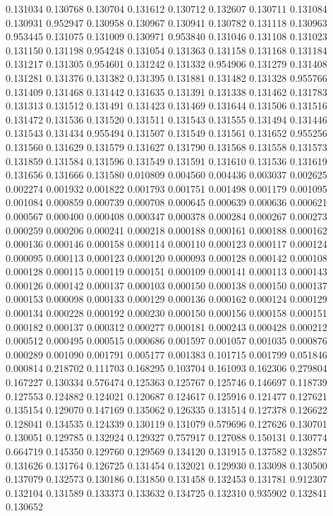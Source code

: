 0.131034
0.130768
0.130704
0.131612
0.130712
0.132607
0.130711
0.131084
0.130931
0.952947
0.130958
0.130967
0.130941
0.130782
0.131118
0.130963
0.953445
0.131075
0.131009
0.130971
0.953840
0.131046
0.131108
0.131023
0.131150
0.131198
0.954248
0.131054
0.131363
0.131158
0.131168
0.131184
0.131217
0.131305
0.954601
0.131242
0.131332
0.954906
0.131279
0.131408
0.131281
0.131376
0.131382
0.131395
0.131881
0.131482
0.131328
0.955766
0.131409
0.131468
0.131442
0.131635
0.131391
0.131338
0.131462
0.131783
0.131313
0.131512
0.131491
0.131423
0.131469
0.131644
0.131506
0.131516
0.131472
0.131536
0.131520
0.131511
0.131543
0.131555
0.131494
0.131446
0.131543
0.131434
0.955494
0.131507
0.131549
0.131561
0.131652
0.955256
0.131560
0.131629
0.131579
0.131627
0.131790
0.131568
0.131558
0.131573
0.131859
0.131584
0.131596
0.131549
0.131591
0.131610
0.131536
0.131619
0.131656
0.131666
0.131580
0.010809
0.004560
0.004436
0.003037
0.002625
0.002274
0.001932
0.001822
0.001793
0.001751
0.001498
0.001179
0.001095
0.001084
0.000859
0.000739
0.000708
0.000645
0.000639
0.000636
0.000621
0.000567
0.000400
0.000408
0.000347
0.000378
0.000284
0.000267
0.000273
0.000259
0.000206
0.000241
0.000218
0.000188
0.000161
0.000188
0.000162
0.000136
0.000146
0.000158
0.000114
0.000110
0.000123
0.000117
0.000124
0.000095
0.000113
0.000123
0.000120
0.000093
0.000128
0.000142
0.000108
0.000128
0.000115
0.000119
0.000151
0.000109
0.000141
0.000113
0.000143
0.000126
0.000142
0.000137
0.000103
0.000150
0.000138
0.000150
0.000137
0.000153
0.000098
0.000133
0.000129
0.000136
0.000162
0.000124
0.000129
0.000134
0.000228
0.000192
0.000230
0.000150
0.000156
0.000158
0.000151
0.000182
0.000137
0.000312
0.000277
0.000181
0.000243
0.000428
0.000212
0.000512
0.000495
0.000515
0.000686
0.001597
0.001057
0.001035
0.000876
0.000289
0.001090
0.001791
0.005177
0.001383
0.101715
0.001799
0.051846
0.000814
0.218702
0.111703
0.168295
0.103704
0.161093
0.162306
0.279804
0.167227
0.130334
0.576474
0.125363
0.125767
0.125746
0.146697
0.118739
0.127553
0.124882
0.124021
0.120687
0.124617
0.125916
0.121477
0.127621
0.135154
0.129070
0.147169
0.135062
0.126335
0.131514
0.127378
0.126622
0.128041
0.134535
0.124339
0.130119
0.131079
0.579696
0.127626
0.130701
0.130051
0.129785
0.132924
0.129327
0.757917
0.127088
0.150131
0.130774
0.664719
0.145350
0.129760
0.129569
0.134120
0.131915
0.137582
0.132857
0.131626
0.131764
0.126725
0.131454
0.132021
0.129930
0.133098
0.130500
0.137079
0.132573
0.130186
0.131850
0.131458
0.132453
0.131781
0.912307
0.132104
0.131589
0.133373
0.133632
0.134725
0.132310
0.935902
0.132841
0.130652
